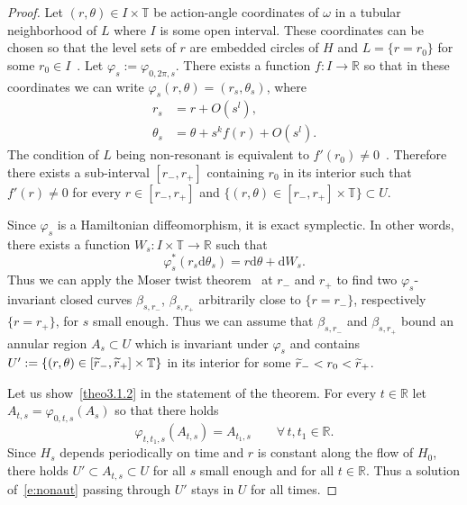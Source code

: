 \documentclass[10pt]{amsart}
\theoremstyle{definition}
\newcommand{\R}{\mathbb{R}}
\newcommand{\T}{\mathbb{T}}
\newcommand{\diff}{\mathrm{d}}
\let\oldtilde\tilde
\renewcommand*{\tilde}[1]{\mathchoice{\widetilde{#1}}{\widetilde{#1}}{\oldtilde{#1}}{\oldtilde{#1}}}
\let\oldforall\forall
\renewcommand*{\forall}{\mathrel{\oldforall}}
\begin{document}
\begin{proof}
Let $(r,\theta)\in I\times \T$ be action-angle coordinates of $\omega$ in a tubular neighborhood of $L$ where $I$ is some open interval. These coordinates can be chosen so that the level sets of $r$ are embedded circles of $H$ and $L=\{r=r_0\}$ for some $r_0\in I$~\cite{Arnold:1978aq}. Let $\varphi_s:=\varphi_{0,2\pi,s}$. There exists a function $f:I\to\R$ so that in these coordinates we can write $\varphi_s(r,\theta)=(r_s,\theta_s)$, where
\begin{equation}\label{e:rtheta}
\begin{aligned}
r_s&=r+O\left(s^l\right),\\
\theta_s&=\theta+s^kf(r)+O\left(s^l\right).
\end{aligned}
\end{equation}
The condition of $L$ being non-resonant is equivalent to $f'(r_0)\neq0$~\cite{AB21}. Therefore there exists a sub-interval $[r_-,r_+]$ containing $r_0$ in its interior such that $f'(r)\neq 0$ for every $r\in[r_-,r_+]$ and $\{(r,\theta)\in [r_-,r_+]\times \T\}\subset U$.

Since $\varphi_s$ is a Hamiltonian diffeomorphism, it is exact symplectic. In other words, there exists a function $W_s:I\times\T\to\R$ such that
\[
\varphi_s^*\left(r_s\diff\theta_s\right)=r\diff\theta+\diff W_s.
\]
Thus we can apply the Moser twist theorem~\cite{Mos62} at $r_-$ and $r_+$ to find two $\varphi_s$-invariant closed curves $\beta_{s,r_-}$, $\beta_{s,r_+}$ arbitrarily close to $\{r=r_-\}$, respectively $\{r=r_+\}$, for $s$ small enough. Thus we can assume that $\beta_{s,r_-}$ and $\beta_{s,r_+}$ bound an annular region $A_s\subset U$ which is invariant under $\varphi_s$ and contains $U':=\{(r,\theta)\in[\tilde r_-,\tilde r_+]\times \T\}$ in its interior for some $\tilde r_-<r_0<\tilde r_+$.

Let us show~\eqref{theo3.1.2} in the statement of the theorem. For every $t\in\R$ let $A_{t,s}=\varphi_{0,t,s}(A_s)$ so that there holds
\[
\varphi_{t,t_1,s}(A_{t,s})=A_{t_1,s}\qquad \forall\,t,t_1\in\R.
\]
Since $H_s$ depends periodically on time and $r$ is constant along the flow of $H_0$, there holds $U'\subset A_{t,s}\subset U$ for all $s$ small enough and for all $t\in\R$. Thus a solution of~\eqref{e:nonaut} passing through $U'$ stays in $U$ for all times.


\end{proof}
\end{document}
